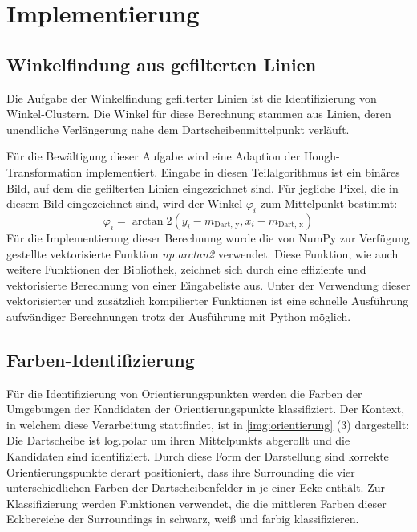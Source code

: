 
\section{Implementierung}
\label{sec:cv:implementierung}



\subsection{Winkelfindung aus gefilterten Linien}
\label{sec:winkelfindung_impl}

Die Aufgabe der Winkelfindung gefilterter Linien ist die Identifizierung von Winkel-Clustern. Die Winkel für diese Berechnung stammen aus Linien, deren unendliche Verlängerung nahe dem Dartscheibenmittelpunkt verläuft.

Für die Bewältigung dieser Aufgabe wird eine Adaption der Hough-Transformation implementiert. Eingabe in diesen Teilalgorithmus ist ein binäres Bild, auf dem die gefilterten Linien eingezeichnet sind. Für jegliche Pixel, die in diesem Bild eingezeichnet sind, wird der Winkel $\varphi_i$ zum Mittelpunkt bestimmt:
\[\varphi_i = \arctan2\left( y_i - m_\text{Dart, y}, x_i - m_\text{Dart, x} \right)\]
Für die Implementierung dieser Berechnung wurde die von NumPy zur Verfügung gestellte vektorisierte Funktion \textit{np.arctan2} verwendet. Diese Funktion, wie auch weitere Funktionen der Bibliothek, zeichnet sich durch eine effiziente und vektorisierte Berechnung von einer Eingabeliste aus. Unter der Verwendung dieser vektorisierter und zusätzlich kompilierter Funktionen ist eine schnelle Ausführung aufwändiger Berechnungen trotz der Ausführung mit Python möglich.



\subsection{Farben-Identifizierung}
\label{sec:farbidentifizierung_impl}

Für die Identifizierung von Orientierungspunkten werden die Farben der Umgebungen der Kandidaten der Orientierungspunkte klassifiziert. Der Kontext, in welchem diese Verarbeitung stattfindet, ist in \autoref{img:orientierung} (3) dargestellt: Die Dartscheibe ist log.polar um ihren Mittelpunkts abgerollt und die Kandidaten sind identifiziert. Durch diese Form der Darstellung sind korrekte Orientierungspunkte derart positioniert, dass ihre Surrounding die vier unterschiedlichen Farben der Dartscheibenfelder in je einer Ecke enthält. Zur Klassifizierung werden Funktionen verwendet, die die mittleren Farben dieser Eckbereiche der Surroundings in schwarz, weiß und farbig klassifizieren.

